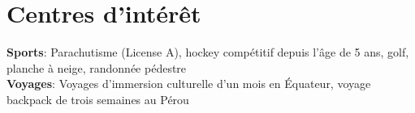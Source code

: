 \documentclass[letterpaper,11pt]{article}
\begin{document}
\section{Centres d'intérêt}
  \begin{itemize}[leftmargin=0.15in, label={}]
    \small{\item{
    \textbf{Sports}{: Parachutisme (License A), hockey compétitif depuis l'âge de 5 ans, golf, planche à neige, randonnée pédestre} \\
    \textbf{Voyages}{: Voyages d'immersion culturelle d'un mois en Équateur, voyage backpack de trois semaines au Pérou} \\
    }}
  \end{itemize}
\end{document}
